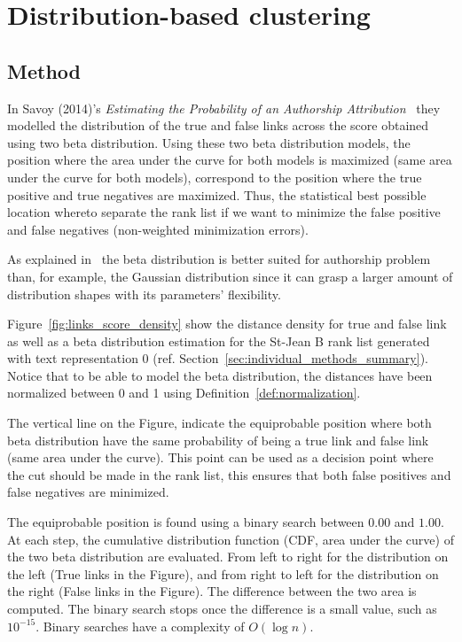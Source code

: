 \section{Distribution-based clustering\label{sec:distribution_based_clustering}}

\subsection{Method}

In Savoy (2014)'s \textit{Estimating the Probability of an Authorship Attribution}~\cite{savoy_probability} they modelled the distribution of the true and false links across the score obtained using two beta distribution.
Using these two beta distribution models, the position where the area under the curve for both models is maximized (same area under the curve for both models), correspond to the position where the true positive and true negatives are maximized.
Thus, the statistical best possible location whereto separate the rank list if we want to minimize the false positive and false negatives (non-weighted minimization errors).

As explained in~\cite{savoy_probability} the beta distribution is better suited for authorship problem than, for example, the Gaussian distribution since it can grasp a larger amount of distribution shapes with its parameters' flexibility.

Figure~\ref{fig:links_score_density} show the distance density for true and false link as well as a beta distribution estimation for the St-Jean B rank list generated with text representation 0 (ref. Section~\ref{sec:individual_methods_summary}).
Notice that to be able to model the beta distribution, the distances have been normalized between 0 and 1 using Definition~\ref{def:normalization}.

The vertical line on the Figure, indicate the equiprobable position where both beta distribution have the same probability of being a true link and false link (same area under the curve).
This point can be used as a decision point where the cut should be made in the rank list, this ensures that both false positives and false negatives are minimized.

The equiprobable position is found using a binary search between $0.00$ and $1.00$.
At each step, the cumulative distribution function (CDF, area under the curve) of the two beta distribution are evaluated.
From left to right for the distribution on the left (True links in the Figure), and from right to left for the distribution on the right (False links in the Figure).
The difference between the two area is computed.
The binary search stops once the difference is a small value, such as $10^{-15}$.
Binary searches have a complexity of $O(\log n)$.

